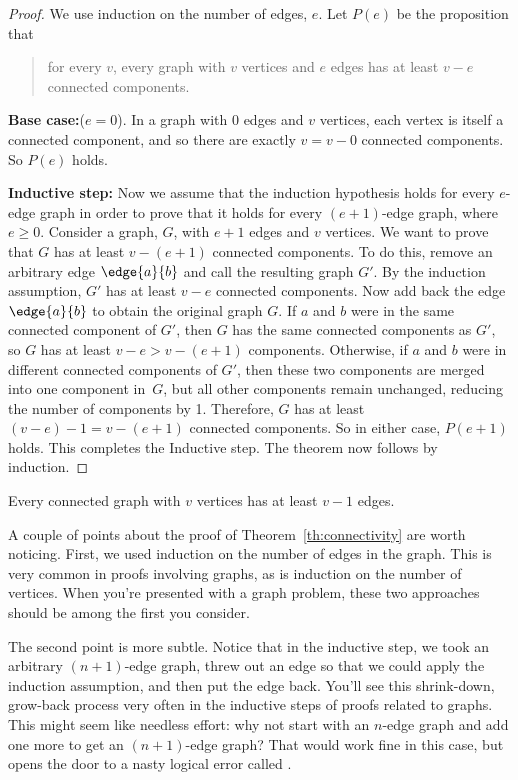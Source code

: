\begin{proof}
We use induction on the number of edges, $e$.  Let $P(e)$ be the
proposition that
\begin{quote}
for every $v$, every graph with $v$ vertices and $e$ edges has at least
$v-e$ connected components.
\end{quote}

\textbf{Base case:}($e=0$).  In a graph with 0 edges and $v$ vertices,
each vertex is itself a connected component, and so there are exactly $v =
v - 0$ connected components.  So $P(e)$ holds.

\textbf{Inductive step:} Now we assume that the induction hypothesis
holds for every $e$-edge graph in order to prove that it holds for
every $(e+1)$-edge graph, where $e \geq 0$.  Consider a graph, $G$,
with $e + 1$ edges and $v$ vertices.  We want to prove that $G$ has at
least $v - (e+1)$ connected components.  To do this, remove an
arbitrary edge $\edge{a}{b}$ and call the resulting graph $G'$.  By
the induction assumption, $G'$ has at least $v - e$ connected
components.  Now add back the edge $\edge{a}{b}$ to obtain the
original graph $G$.  If $a$ and $b$ were in the same connected
component of $G'$, then $G$ has the same connected components as $G'$,
so $G$ has at least $v -e > v - (e+1)$ components.  Otherwise, if $a$
and $b$ were in different connected components of $G'$, then these two
components are merged into one component in~$G$, but all other
components remain unchanged, reducing the number of components by 1.
Therefore, $G$ has at least $(v - e) - 1 = v - (e+1)$ connected
components.  So in either case, $P(e+1)$ holds.  This completes the
Inductive step.  The theorem now follows by induction.
\end{proof}

\begin{corollary}
\label{cor:n-1}
Every connected graph with $v$ vertices has at least $v - 1$ edges.
\end{corollary}

A couple of points about the proof of Theorem~\ref{th:connectivity}
are worth noticing.  First, we used induction on the number of edges
in the graph.  This is very common in proofs involving graphs, as is
induction on the number of vertices.  When you're presented with a
graph problem, these two approaches should be among the first you
consider.

The second point is more subtle.  Notice that in the inductive step,
we took an arbitrary $(n+1)$-edge graph, threw out an edge so that
we could apply the induction assumption, and then put the edge back.
You'll see this shrink-down, grow-back process very often in the
inductive steps of proofs related to graphs.  This might seem like
needless effort: why not start with an $n$-edge graph and add one
more to get an $(n+1)$-edge graph?  That would work fine in this
case, but opens the door to a nasty logical error called
.

